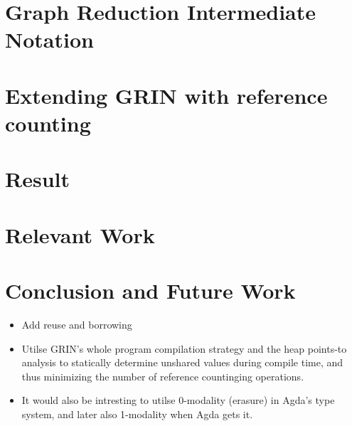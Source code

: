 \documentclass{article}
\begin{document}





\section{Graph Reduction Intermediate Notation}

\section{Extending GRIN with reference counting}

\section{Result}

\section{Relevant Work}

\section{Conclusion and Future Work}
\begin{itemize}
\item Add reuse and borrowing
\item Utilse GRIN's whole program compilation strategy and the heap points-to analysis to statically determine unshared values during compile time, and thus minimizing the number of reference countinging operations.
\item It would also be intresting to utilse 0-modality (erasure) in Agda's type system, and later also 1-modality when Agda gets it.
\end{itemize}


\printbibliography
\end{document}
